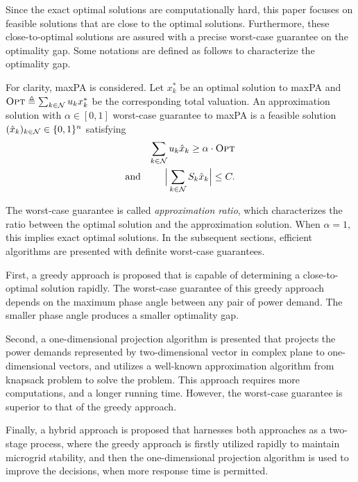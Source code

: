 Since the exact optimal solutions are computationally hard, this paper focuses on feasible solutions that are close to the optimal solutions. Furthermore, these close-to-optimal solutions are assured with a precise worst-case guarantee on the optimality gap. Some notations are defined as follows to characterize the optimality gap.
\\


\begin{definition}
For clarity, {\sc maxPA} is considered.
Let $ x^\ast_k $ be an optimal solution to {\sc maxPA} and $\OPT \triangleq \sum_{k\in{\cal N}}u_k x^\ast_k$ be the corresponding total valuation.
An approximation solution with $\alpha \in [0, 1]$ worst-case guarantee to {\sc maxPA} is a feasible solution $(\hat{x}_k)_{k \in {\cal N}} \in \{0, 1\}^n$ satisfying %
\begin{eqnarray}
& &   \displaystyle \sum_{k\in{\cal N}}u_k \hat{x}_k\ge \alpha \cdot \OPT \\
\text{and} & & \displaystyle \Big|\sum_{k\in{\cal N}}S_k \hat{x}_k\Big| \le C \label{C1'}.
\end{eqnarray}
\end{definition}


The worst-case guarantee is called {\em approximation ratio}, which characterizes the ratio between the optimal solution and the approximation solution. When $\alpha = 1$, this implies exact optimal solutions. In the subsequent sections, efficient algorithms are presented with definite worst-case guarantees.

First, a greedy approach is proposed that is capable of determining a close-to-optimal solution rapidly. The worst-case guarantee of this greedy approach depends on the maximum phase angle between any pair of power demand. The smaller phase angle produces a smaller optimality gap. 

Second, a one-dimensional projection algorithm is presented that projects the power demands represented by two-dimensional vector in complex plane to one-dimensional vectors, and utilizes a well-known approximation algorithm from knapsack problem to solve the problem. This approach requires more computations, and a longer running time. However, the worst-case guarantee is superior to that of the greedy approach. 

Finally, a hybrid approach is proposed that harnesses both approaches as a two-stage process, where the greedy approach is firstly utilized rapidly to maintain microgrid stability, and then the one-dimensional projection algorithm is used to improve the decisions, when more response time is permitted.

